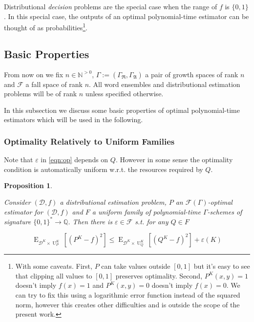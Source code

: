 \documentclass{article}
\numberwithin{equation}{section}
\theoremstyle{definition}
\theoremstyle{plain}
\newtheorem{proposition}{Proposition}[section]
\newcommand{\Bool}{\{0,1\}}
\newcommand{\Words}{{\Bool^*}}
\DeclareMathOperator{\E}{E}
\DeclareMathOperator{\Un}{U}
\newcommand{\Nats}{\mathbb{N}}
\newcommand{\Rats}{\mathbb{Q}}
\newcommand{\Dist}{\mathcal{D}}
\newcommand{\GrowR}{\Gamma_{\mathfrak{R}}}
\newcommand{\GrowA}{\Gamma_{\mathfrak{A}}}
\newcommand{\Grow}{\Gamma:=(\GrowR,\GrowA)}
\newcommand{\Fall}{\mathcal{F}}
\newcommand{\EG}{\Fall(\Gamma)}
\begin{document}
Distributional \emph{decision} problems are the special case when the range of $f$ is $\Bool$. In this special case, the outputs of an optimal polynomial-time estimator can be thought of as probabilities\footnote{With some caveats. First, $P$ can take values outside $[0,1]$ but it's easy to see that clipping all values to $[0,1]$ preserves optimality. Second, $P^{K}(x,y)=1$ doesn't imply $f(x) = 1$ and $P^{K}(x,y)=0$ doesn't imply $f(x)=0$. We can try to fix this using a logarithmic error function instead of the squared norm, however this creates other difficulties and is outside the scope of the present work.}.

\subsection{Basic Properties}

From now on we fix $n \in \Nats^{>0}$, $\Grow$ a pair of growth spaces of rank $n$ and $\Fall$ a fall space of rank $n$. All word ensembles and distributional estimation problems will be of rank ${n}$ unless specified otherwise.

In this subsection we discuss some basic properties of optimal polynomial-time estimators which will be used in the following.

\subsubsection{Optimality Relatively to Uniform Families}

Note that $\varepsilon$ in \ref{eqn:op} depends on $Q$. However in some sense the optimality condition is automatically uniform w.r.t. the resources required by $Q$.

\begin{proposition}
\label{prp:unif}

Consider $(\Dist,f)$ a distributional estimation problem, $P$ an $\EG$-optimal estimator for $(\Dist,f)$ and $F$ a uniform family of polynomial-time $\Gamma$-schemes of signature $\Words \rightarrow \Rats$. Then there is $\varepsilon \in \Fall$ s.t. for any $Q \in F$

\begin{equation}
\E_{\Dist^{K} \times \Un_P^{K}}[(P^{K} - f)^2] \leq \E_{\Dist^{K} \times \Un_Q^{K}}[(Q^{K} - f)^2] + \varepsilon(K)
\end{equation}

\end{proposition}
\end{document}
